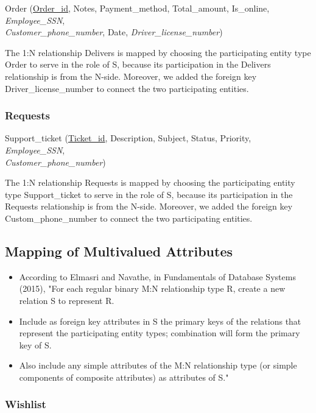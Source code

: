 Order (\underline{Order\_id}, Notes, Payment\_method, Total\_amount, Is\_online, \textit{Employee\_SSN}, \\
\textit{Customer\_phone\_number}, Date, \textit{Driver\_license\_number})

The 1:N relationship Delivers is mapped by choosing the participating entity type Order to serve in the role of S, because its participation in the Delivers relationship is from the N-side. Moreover, we added the foreign key Driver\_license\_number to connect the two participating entities.

\subsubsection{Requests}

Support\_ticket (\underline{Ticket\_id}, Description, Subject, Status, Priority, \textit{Employee\_SSN}, \\
\textit{Customer\_phone\_number})

The 1:N relationship Requests is mapped by choosing the participating entity type Support\_ticket to serve in the role of S, because its participation in the Requests relationship is from the N-side. Moreover, we added the foreign key Custom\_phone\_number to connect the two participating entities.

\subsection{Mapping of Multivalued Attributes}

\begin{itemize}
  \item According to Elmasri and Navathe, in Fundamentals of Database Systems (2015), "For each regular binary M:N relationship type R, create a new relation S to represent R.
  \item Include as foreign key attributes in S the primary keys of the relations that represent the participating entity types; combination will form the primary key of S.
  \item Also include any simple attributes of the M:N relationship type (or simple components of composite attributes) as attributes of S." \cite{elmasri}
\end{itemize}

\subsubsection{Wishlist}

